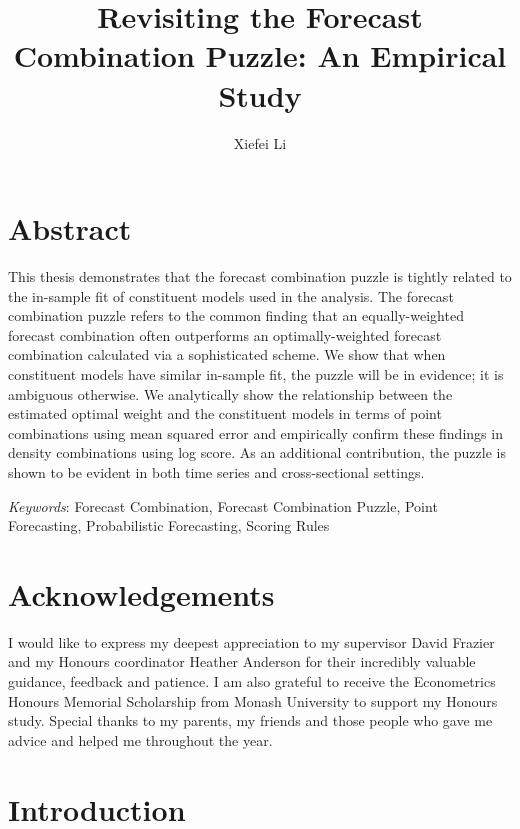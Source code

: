 \documentclass{monashthesis}
\author{Xiefei Li}
\title{Revisiting the Forecast Combination Puzzle: An Empirical Study}
\begin{document}

\titlepage

{\sf\tighttoc\doublespacing}

\clearpage{}\setcounter{page}{1}

\hypertarget{abstract}{%
\chapter*{Abstract}\label{abstract}}

This thesis demonstrates that the forecast combination puzzle is tightly related to the in-sample fit of constituent models used in the analysis. The forecast combination puzzle refers to the common finding that an equally-weighted forecast combination often outperforms an optimally-weighted forecast combination calculated via a sophisticated scheme. We show that when constituent models have similar in-sample fit, the puzzle will be in evidence; it is ambiguous otherwise. We analytically show the relationship between the estimated optimal weight and the constituent models in terms of point combinations using mean squared error and empirically confirm these findings in density combinations using log score. As an additional contribution, the puzzle is shown to be evident in both time series and cross-sectional settings.

\vspace{1cm}

\textit{Keywords}: Forecast Combination, Forecast Combination Puzzle, Point Forecasting, Probabilistic Forecasting, Scoring Rules

\newpage

\hypertarget{acknowledgements}{%
\chapter*{Acknowledgements}\label{acknowledgements}}

I would like to express my deepest appreciation to my supervisor David Frazier and my Honours coordinator Heather Anderson for their incredibly valuable guidance, feedback and patience. I am also grateful to receive the Econometrics Honours Memorial Scholarship from Monash University to support my Honours study. Special thanks to my parents, my friends and those people who gave me advice and helped me throughout the year.

\hypertarget{introduction}{%
\chapter{Introduction}\label{introduction}}
\end{document}
